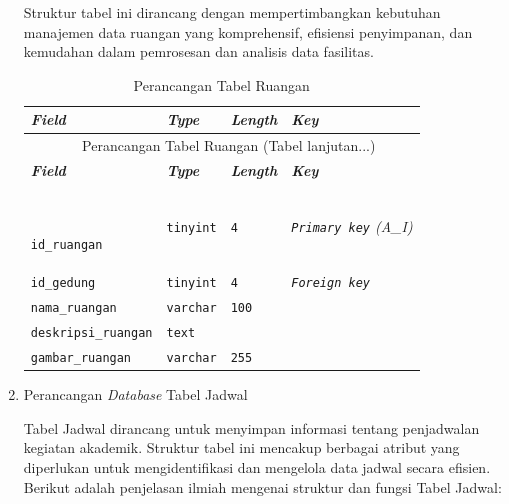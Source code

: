 \begin{enumerate}
	      Struktur tabel ini dirancang dengan mempertimbangkan kebutuhan manajemen data ruangan yang komprehensif, efisiensi penyimpanan, dan kemudahan dalam pemrosesan dan analisis data fasilitas.

		      {
			      \fontsize{10}{13}\selectfont
			      \begin{longtable}{p{3 cm} p{3cm} p{3 cm} p{3.4 cm}}
				      \caption{Perancangan Tabel Ruangan}
				      \label{admin}                                                                                                          \\
				      \hline
				      \textbf{\textit{Field}}     & \textbf{\textit{Type}} & \textbf{\textit{Length}} & \textbf{\textit{Key}}                \\
				      \hline
				      \endfirsthead

				      \multicolumn{4}{c}{\tablename\ \thetable\ {Perancangan Tabel Ruangan} \space (Tabel lanjutan...)}                      \\
				      \hline
				      \textbf{\textit{Field}}     & \textbf{\textit{Type}} & \textbf{\textit{Length}} & \textbf{\textit{Key}}                \\
				      \
				      \endhead

				      \texttt{id\_ruangan}        & \texttt{tinyint}       & \texttt{4}               & \textit{\texttt{Primary key} (A\_I)} \\
				      \texttt{id\_gedung}         & \texttt{tinyint}       & \texttt{4}               & \textit{\texttt{Foreign key}}        \\
				      \texttt{nama\_ruangan}      & \texttt{varchar}       & \texttt{100}             &                                      \\
				      \texttt{deskripsi\_ruangan} & \texttt{text}          &                          &                                      \\
				      \texttt{gambar\_ruangan}    & \texttt{varchar}       & \texttt{255}             &                                      \\
				      \hline
			      \end{longtable}
		      }

	\item Perancangan \textit{Database} Tabel Jadwal

	      Tabel Jadwal dirancang untuk menyimpan informasi tentang penjadwalan kegiatan akademik. Struktur tabel ini mencakup berbagai atribut yang diperlukan untuk mengidentifikasi dan mengelola data jadwal secara efisien. Berikut adalah penjelasan ilmiah mengenai struktur dan fungsi Tabel Jadwal:


\end{enumerate}
